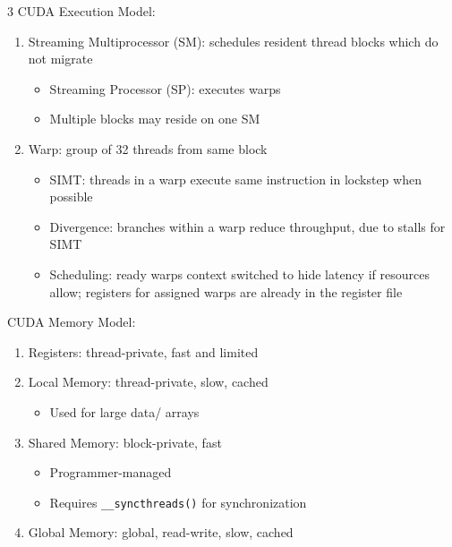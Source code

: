 \documentclass[12pt, a4paper]{article}
\begin{document}
\begin{multicols*}{3}
CUDA Execution Model:
\begin{enumerate}[\roman*.]
  \item Streaming Multiprocessor (SM): schedules resident thread blocks which do not migrate
    \begin{itemize}[leftmargin=*]\vspace{3pt}
      \item Streaming Processor (SP): executes warps
      \item Multiple blocks may reside on one SM 
    \end{itemize}
  \item Warp: group of 32 threads from same block
    \begin{itemize}[leftmargin=*]\vspace{3pt}
      \item SIMT: threads in a warp execute same instruction in lockstep when possible
      \item Divergence: branches within a warp reduce throughput, due to stalls for SIMT
      \item Scheduling: ready warps context switched to hide latency if resources allow; registers for assigned warps are already in the register file 
    \end{itemize}
\end{enumerate}
\vspace{-1em}
\colbreak
CUDA Memory Model:
\begin{enumerate}[\roman*.]
  \item Registers: thread-private, fast and limited 
  \item Local Memory: thread-private, slow, cached 
    \begin{itemize}[leftmargin=*]\vspace{3pt}
      \item Used for large data/ arrays
    \end{itemize}
  \item Shared Memory: block-private, fast
    \begin{itemize}[leftmargin=*]\vspace{3pt}
      \item Programmer-managed
      \item Requires \lstinline|__syncthreads()| for synchronization
    \end{itemize}
  \item Global Memory: global, read-write, slow, cached 
    \begin{itemize}[leftmargin=*]\vspace{3pt}

\end{itemize}
\end{enumerate}
\end{multicols*}
\end{document}
